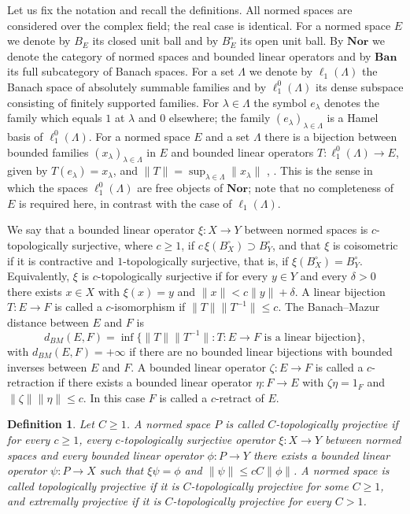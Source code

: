 \documentclass[12pt]{article}
\newtheorem{definition}[theorem]{Definition}
\newcommand{\Nor}{\mathbf{Nor}}
\newcommand{\Ban}{\mathbf{Ban}}
\newcommand{\lo}[1]{\ell_1^0(#1)}
\newcommand{\ellone}[1]{\ell_1(#1)}
\newcommand{\norm}[1]{\lVert #1\rVert}
\newcommand{\BM}{d_{BM}}
\begin{document}
Let us fix the notation and recall the definitions. All normed spaces are
considered over the complex field; the real case is identical. For a normed
space $E$ we denote by $B_E$ its closed unit ball and by $B_E^\circ$ its open
unit ball. By $\Nor$ we denote the category of normed spaces and bounded linear
operators and by $\Ban$ its full subcategory of Banach spaces. For a set
$\Lambda$ we denote by $\ellone{\Lambda}$ the Banach space of absolutely
summable families and by $\lo{\Lambda}$ its dense subspace consisting of finitely
supported families. For $\lambda\in\Lambda$ the symbol $e_\lambda$ denotes the
family which equals $1$ at $\lambda$ and $0$ elsewhere; the family
${(e_\lambda)}_{\lambda\in\Lambda}$ is a Hamel basis of $\lo{\Lambda}$. For a
normed space $E$ and a set $\Lambda$ there is a bijection between bounded
families ${(x_\lambda)}_{\lambda\in\Lambda}$ in $E$ and bounded linear
operators $T:\lo{\Lambda}\to E$, given by $T(e_\lambda)=x_\lambda$, and
$\norm{T}=\sup_{\lambda\in\Lambda}\norm{x_\lambda}$
\cite[proposition 2.1]{HelExtrProjSeqAlg}, \cite[proposition 1.10]{GronLiftProbNormSp}.
This is the sense in which the spaces $\lo{\Lambda}$ are free objects of
$\Nor$; note that no completeness of $E$ is required here, in contrast with
the case of $\ellone{\Lambda}$.

We say that a bounded linear operator
$\xi:X\to Y$ between normed spaces is $c$-topologically surjective, where
$c\geq 1$, if $c\,\xi(B_X^\circ)\supset B_Y^\circ$, and that $\xi$ is
coisometric if it is contractive and $1$-topologically surjective, that is, if
$\xi(B_X^\circ)=B_Y^\circ$. Equivalently, $\xi$ is $c$-topologically surjective
if for every $y\in Y$ and every $\delta>0$ there exists $x\in X$ with
$\xi(x)=y$ and $\norm{x}<c\norm{y}+\delta$. A linear bijection $T:E\to F$ is
called a $c$-isomorphism if $\norm{T}\norm{T^{-1}}\leq c$. The Banach--Mazur
distance between $E$ and $F$ is
\[
\BM(E,F)=\inf\{\norm{T}\norm{T^{-1}}:T:E\to F \mbox{ is a linear bijection}\},
\]
with $\BM(E,F)=+\infty$ if there are no bounded linear bijections with bounded
inverses between $E$ and $F$. A bounded linear operator $\zeta:E\to F$ is
called a $c$-retraction if there exists a bounded linear operator $\eta:F\to E$
with $\zeta\eta=1_F$ and $\norm{\zeta}\norm{\eta}\leq c$. In this case $F$ is
called a $c$-retract of $E$.

\begin{definition}\label{DefTopProj} Let $C\geq 1$. A normed space $P$ is
    called $C$-topologically projective if for every $c\geq 1$, every
    $c$-topologically surjective operator $\xi:X\to Y$ between normed spaces
    and every bounded linear operator $\phi:P\to Y$ there exists a bounded
    linear operator $\psi:P\to X$ such that $\xi\psi=\phi$ and
    $\norm{\psi}\leq cC\norm{\phi}$. A normed space is called topologically
    projective if it is $C$-topologically projective for some $C\geq 1$, and
    extremally projective if it is $C$-topologically projective for every
    $C>1$.
\end{definition}
\end{document}
